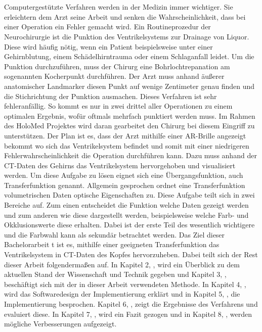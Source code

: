 \chapter{}
\label{sec:Introduction}



Computergestützte Verfahren werden in der Medizin immer wichtiger. Sie erleichtern dem Arzt seine Arbeit und senken die Wahrscheinlichkeit, dass bei einer Operation ein Fehler gemacht wird.
\newline
{}
Ein Routineprozedur der Neurochirurgie ist die Punktion des Ventrikelsystems zur Drainage von Liquor. Diese wird häufig nötig, wenn ein Patient beispielsweise unter einer Gehirnblutung, einem Schädelhirntrauma oder einem Schlaganfall leidet. Um die Punktion durchzuführen, muss der Chirurg eine Bohrlochtrepanation am sogenannten Kocherpunkt durchführen. Der Arzt muss anhand äußerer anatomischer Landmarker diesen Punkt auf wenige Zentimeter genau finden und die Stichrichtung der Punktion ausmachen. Dieses Verfahren ist sehr fehleranfällig. So kommt es nur in zwei drittel aller Operationen zu einem optimalen Ergebnis, wofür oftmals mehrfach punktiert werden muss.
\newline
Im Rahmen des HoloMed Projektes wird daran gearbeitet den Chirurg bei diesem Eingriff zu unterstützen. Der Plan ist es, dass der Arzt mithilfe einer AR-Brille angezeigt bekommt wo sich das Ventrikelsystem befindet und somit mit einer niedrigeren Fehlerwahrscheinlichkeit die Operation durchführen kann.
\newline
Dazu muss anhand der CT-Daten des Gehirns das Ventrikelsystem hervorgehoben und visualisiert werden. Um diese Aufgabe zu lösen eignet sich eine Übergangsfunktion, auch Transferfunktion genannt.
\newline
Allgemein gesprochen ordnet eine Transferfunktion volumetrischen Daten optische Eigenschaften zu. Diese Aufgabe teilt sich in zwei Bereiche auf. Zum einen entscheidet die Funktion welche Daten gezeigt werden und zum anderen wie diese dargestellt werden, beispielsweise welche Farb- und Okklusionswerte diese erhalten. Dabei ist der erste Teil des wesentlich wichtigere und die Farbwahl kann als sekundär betrachtet werden.
\newline
Das Ziel dieser Bachelorarbeit t ist es, mithilfe einer geeigneten Transferfunktion das Ventrikelsystem in CT-Daten des Kopfes hervorzuheben.
\newline
Dabei teilt sich der Rest dieser Arbeit folgendermaßen auf. In Kapitel 2, , wird ein Überblick zu dem aktuellen Stand der Wissenschaft und Technik gegeben und Kapitel 3, , beschäftigt sich mit der in dieser Arbeit verwendeten Methode. In Kapitel 4, , wird das Softwaredesign der Implementierung erklärt und in Kapitel 5, , die Implementierung besprochen. Kapitel 6, , zeigt die Ergebnisse des Verfahrens und evaluiert diese. In Kapitel 7, , wird ein Fazit gezogen und in Kapitel 8, , werden mögliche Verbesserungen aufgezeigt.